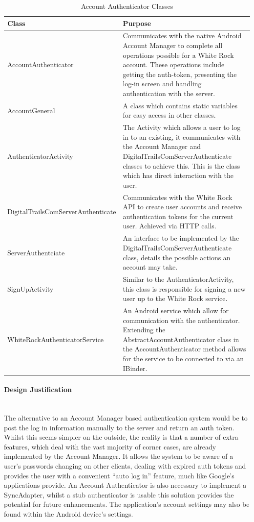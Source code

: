 \documentclass[11pt,a4paper]{report}
\begin{document}
\begin{longtable}{|p{7cm}|p{10cm}|}
\hline \caption{Account Authenticator Classes - Cont. on Next Page} \endfoot
\hline \caption{Account Authenticator Classes} \label{tab:accountauth} \endlastfoot
\hline
\textbf{Class} & \textbf{Purpose} \\ \hline
AccountAuthenticator & Communicates with the native Android Account Manager to complete all operations possible for a White Rock account. These operations include getting the auth-token, presenting the log-in screen and handling authentication with the server. \\ \hline
AccountGeneral & A class which contains static variables for easy access in other classes. \\ \hline
AuthenticatorActivity & The Activity which allows a user to log in to an existing, it communicates with the Account Manager and DigitalTrailsComServerAuthenticate classes to achieve this. This is the class which has direct interaction with the user. \\ \hline
DigitalTrailsComServerAuthenticate & Communicates with the White Rock API to create user accounts and receive authentication tokens for the current user. Achieved via HTTP calls.  \\ \hline
ServerAuthentciate & An interface to be implemented by the DigitalTrailsComServerAuthenticate class, details the possible actions an account may take. \\ \hline
SignUpActivity & Similar to the AuthenticatorActivity, this class is responsible for signing a new user up to the White Rock service. \\ \hline
WhiteRockAuthenticatorService & An Android service which allow for communication with the authenticator. Extending the AbstractAccountAuthenticator class in the AccountAuthenticator method allows for the service to be connected to via an IBinder.  \\ \hline
\end{longtable}

\paragraph*{Design Justification}\mbox{}\\ 
The alternative to an Account Manager based authentication system would be to post the log in information manually to the server and return an auth token. Whilst this seems simpler on the outside, the reality is that a number of extra features, which deal with the vast majority of corner cases, are already implemented by the Account Manager. It allows the system to be aware of a user's passwords changing on other clients, dealing with expired auth tokens and provides the user with a convenient ``auto log in'' feature, much like Google's applications provide. An Account Authenticator is also necessary to implement a SyncAdapter, whilst a stub authenticator is usable this solution provides the potential for future enhancements. The application's account settings may also be found within the Android device's settings.
\end{document}
